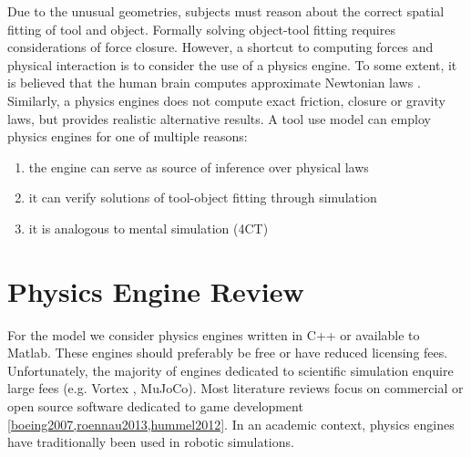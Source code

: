 \documentclass[11]{article}
\begin{document}
Due to the unusual geometries, subjects must reason about the correct spatial fitting of tool and object.    
Formally solving object-tool fitting requires considerations of force closure.
However, a shortcut to computing forces and physical interaction is to consider the use of a physics engine. 
To some extent, it is believed that the human brain computes approximate Newtonian laws \cite{battaglia2013}. 
Similarly, a physics engines does not compute exact friction, closure or gravity laws, but provides realistic alternative results. 
A tool use model can employ physics engines for one of multiple reasons:
\begin{enumerate}
      \item the engine can serve as source of inference over physical laws   
      \item it can verify solutions of tool-object fitting through simulation
      \item it is analogous to mental simulation (4CT)
\end{enumerate}

\section{Physics Engine Review}
For the model we consider physics engines written in C++ or available to Matlab. 
These engines should preferably be free or have reduced licensing fees. 
Unfortunately, the majority of engines dedicated to scientific simulation enquire large fees (e.g. Vortex , MuJoCo).
Most literature reviews focus on commercial or open source software dedicated to game development \ref{boeing2007,roennau2013,hummel2012}. 
In an academic context, physics engines have traditionally been used in robotic simulations. 


\printbibliography
\end{document}
